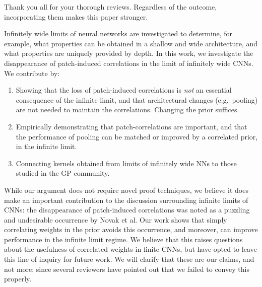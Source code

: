 \documentclass{article}
\begin{document}
Thank you all for your thorough reviews. Regardless of the outcome, incorporating them makes this paper stronger.

Infinitely wide limits of neural networks are investigated to determine, for example, what properties can be obtained in a shallow and wide architecture, and what properties are uniquely provided by depth.
In this work, we investigate the disappearance of patch-induced correlations in the limit of infinitely wide CNNs.
We contribute by:
\vspace{-0.27cm}
\begin{enumerate}
    \item Showing that the loss of patch-induced correlations is \emph{not} an essential consequence of the infinite limit, and that architectural changes (e.g.~pooling) are not needed to maintain the correlations. Changing the prior suffices.
    \vspace{-0.15cm}  %
    \item Empirically demonstrating that patch-correlations are important, and that the performance of pooling can be matched or improved by a correlated prior, in the infinite limit.
    \vspace{-0.15cm}  %
    \item Connecting kernels obtained from limits of infinitely wide NNs to those studied in the GP community.
\end{enumerate}
\vspace{-1ex}
While our argument does not require novel proof techniques, we believe it does make an important contribution to the discussion surrounding infinite limits of CNNs: the disappearance of patch-induced correlations was noted as a puzzling and undesirable occurrence by Novak et al. Our work shows that simply correlating weights in the prior avoids this occurrence, and moreover, can improve performance in the infinite limit regime.
We believe that this raises questions about the usefulness of correlated weights in finite CNNs, but have opted to leave this line of inquiry for future work.
We will clarify that these are our claims, and not more; since several reviewers have pointed out that we failed to convey this properly.

\end{document}
